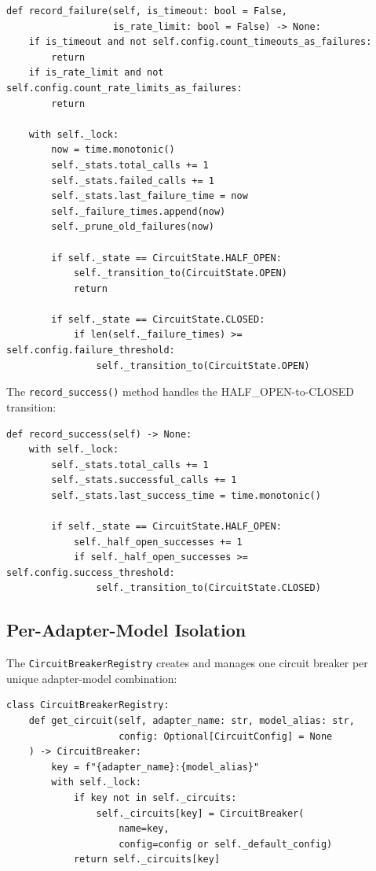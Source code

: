 \documentclass[11pt,a4paper]{article}
\theoremstyle{plain}
\theoremstyle{definition}
\begin{document}
\begin{lstlisting}[style=pythonstyle, caption={Failure recording and state transition from \texttt{circuit\_breaker.py}}]
def record_failure(self, is_timeout: bool = False,
                   is_rate_limit: bool = False) -> None:
    if is_timeout and not self.config.count_timeouts_as_failures:
        return
    if is_rate_limit and not self.config.count_rate_limits_as_failures:
        return

    with self._lock:
        now = time.monotonic()
        self._stats.total_calls += 1
        self._stats.failed_calls += 1
        self._stats.last_failure_time = now
        self._failure_times.append(now)
        self._prune_old_failures(now)

        if self._state == CircuitState.HALF_OPEN:
            self._transition_to(CircuitState.OPEN)
            return

        if self._state == CircuitState.CLOSED:
            if len(self._failure_times) >= self.config.failure_threshold:
                self._transition_to(CircuitState.OPEN)
\end{lstlisting}

The \texttt{record\_success()} method handles the HALF\_OPEN-to-CLOSED
transition:

\begin{lstlisting}[style=pythonstyle, caption={Success recording and recovery from \texttt{circuit\_breaker.py}}]
def record_success(self) -> None:
    with self._lock:
        self._stats.total_calls += 1
        self._stats.successful_calls += 1
        self._stats.last_success_time = time.monotonic()

        if self._state == CircuitState.HALF_OPEN:
            self._half_open_successes += 1
            if self._half_open_successes >= self.config.success_threshold:
                self._transition_to(CircuitState.CLOSED)
\end{lstlisting}

\subsection{Per-Adapter-Model Isolation}

The \texttt{CircuitBreakerRegistry} creates and manages one circuit breaker per
unique adapter-model combination:

\begin{lstlisting}[style=pythonstyle, caption={CircuitBreakerRegistry from \texttt{circuit\_breaker.py}}]
class CircuitBreakerRegistry:
    def get_circuit(self, adapter_name: str, model_alias: str,
                    config: Optional[CircuitConfig] = None
    ) -> CircuitBreaker:
        key = f"{adapter_name}:{model_alias}"
        with self._lock:
            if key not in self._circuits:
                self._circuits[key] = CircuitBreaker(
                    name=key,
                    config=config or self._default_config)
            return self._circuits[key]
\end{lstlisting}
\end{document}
